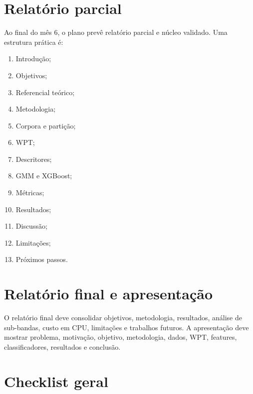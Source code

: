 \documentclass[12pt,a4paper]{article}
\begin{document}
\section{Relatório parcial}

Ao final do mês 6, o plano prevê relatório parcial e núcleo validado. Uma estrutura prática é:
\begin{enumerate}
\item Introdução;
\item Objetivos;
\item Referencial teórico;
\item Metodologia;
\item Corpora e partição;
\item WPT;
\item Descritores;
\item GMM e XGBoost;
\item Métricas;
\item Resultados;
\item Discussão;
\item Limitações;
\item Próximos passos.
\end{enumerate}

\section{Relatório final e apresentação}

O relatório final deve consolidar objetivos, metodologia, resultados, análise de sub-bandas, custo em CPU, limitações e trabalhos futuros. A apresentação deve mostrar problema, motivação, objetivo, metodologia, dados, WPT, features, classificadores, resultados e conclusão.

\section{Checklist geral}
\end{document}
